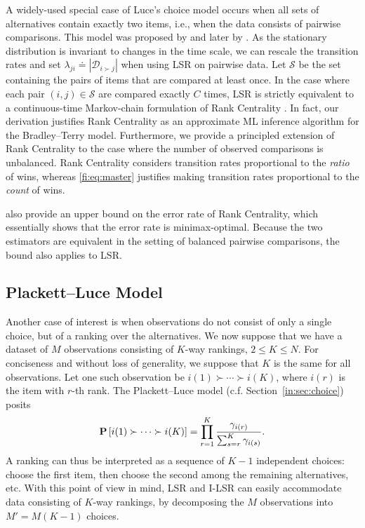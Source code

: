 A widely-used special case of Luce's choice model occurs when all sets of alternatives contain exactly two items, i.e., when the data consists of pairwise comparisons.
This model was proposed by \citet{zermelo1928berechnung} and later by \citet{bradley1952rank}.
As the stationary distribution is invariant to changes in the time scale, we can rescale the transition rates and set $\lambda_{ji} \doteq |\mathcal{D}_{i \succ j}|$ when using LSR on pairwise data.
Let $\mathcal{S}$ be the set containing the pairs of items that are compared at least once.
In the case where each pair $(i, j) \in \mathcal{S}$ are compared exactly $C$ times, LSR is strictly equivalent to a continuous-time Markov-chain formulation of Rank Centrality \citep{negahban2012iterative}.
In fact, our derivation justifies Rank Centrality as an approximate ML inference algorithm for the Bradley--Terry model.
Furthermore, we provide a principled extension of Rank Centrality to the case where the number of observed comparisons is unbalanced.
Rank Centrality considers transition rates proportional to the \emph{ratio} of wins, whereas \eqref{fi:eq:master} justifies making transition rates proportional to the \emph{count} of wins.

\citet{negahban2012iterative} also provide an upper bound on the error rate of Rank Centrality, which essentially shows that the error rate is minimax-optimal.
Because the two estimators are equivalent in the setting of balanced pairwise comparisons, the bound also applies to LSR.

\subsection{Plackett--Luce Model}
\label{fi:sec:partial}

Another case of interest is when observations do not consist of only a single choice, but of a ranking over the alternatives.
We now suppose that we have a dataset of $M$ observations consisting of $K$-way rankings, $2 \le K \le N$.
For conciseness and without loss of generality, we suppose that $K$ is the same for all observations.
Let one such observation be $i(1) \succ \cdots \succ i(K)$, where $i(r)$ is the item with $r$-th rank.
The Plackett--Luce model (c.f. Section~\ref{in:sec:choice}) posits
\begin{align*}
\mathbf{P}\left[  i(1) \succ \cdots \succ i(K)  \right]
  = \prod_{r = 1}^{K} \frac{\gamma_{i(r)}}{\sum_{s = r}^{K} \gamma_{i(s)}}.
\end{align*}
A ranking can thus be interpreted as a sequence of $K-1$ independent choices:
choose the first item, then choose the second among the remaining alternatives, etc.
With this point of view in mind, LSR and I-LSR can easily accommodate data consisting of $K$-way rankings, by decomposing the $M$ observations into $M' = M (K - 1)$ choices.


